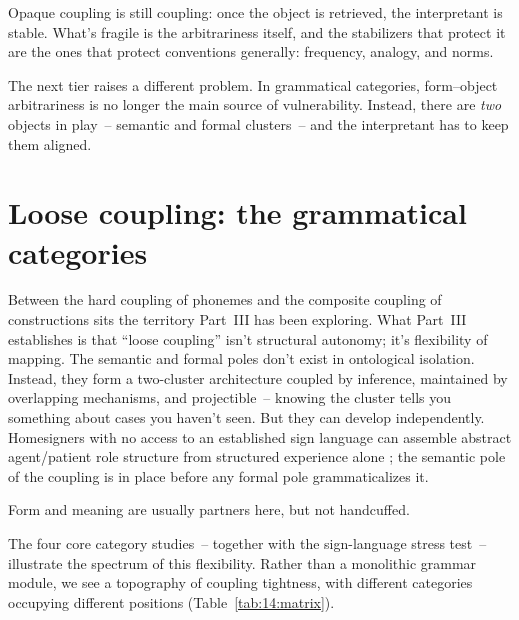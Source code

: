 Opaque coupling is still coupling: once the object is retrieved, the interpretant is stable. What's fragile is the arbitrariness itself, and the stabilizers that protect it are the ones that protect conventions generally: frequency, analogy, and norms.

The next tier raises a different problem. In grammatical categories, form--object arbitrariness is no longer the main source of vulnerability. Instead, there are \emph{two} objects in play~-- semantic and formal clusters~-- and the interpretant has to keep them aligned.

\section{Loose coupling: the grammatical categories}
\label{sec:14:grammatical-categories}

Between the hard coupling of phonemes and the composite coupling of constructions sits the territory Part~III has been exploring. What Part~III establishes is that \enquote{loose coupling} isn't structural autonomy; it's flexibility of mapping. The semantic and formal poles don't exist in ontological isolation. Instead, they form a two-cluster architecture coupled by inference, maintained by overlapping mechanisms, and projectible~-- knowing the cluster tells you something about cases you haven't seen. But they can develop independently. Homesigners with no access to an established sign language can assemble abstract agent/patient role structure from structured experience alone \citep{canudas-grabolosa2026linguisticModel}; the semantic pole of the coupling is in place before any formal pole grammaticalizes it.

Form and meaning are usually partners here, but not handcuffed.

The four core category studies~-- together with the sign-language stress test~-- illustrate the spectrum of this flexibility. Rather than a monolithic grammar module, we see a topography of coupling tightness, with different categories occupying different positions (Table~\ref{tab:14:matrix}).

